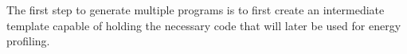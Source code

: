 %
%
%
%
%
%
%
%
%
%

The first step to generate multiple programs is to first create an intermediate template capable of holding the necessary code that will later be used for energy profiling.

